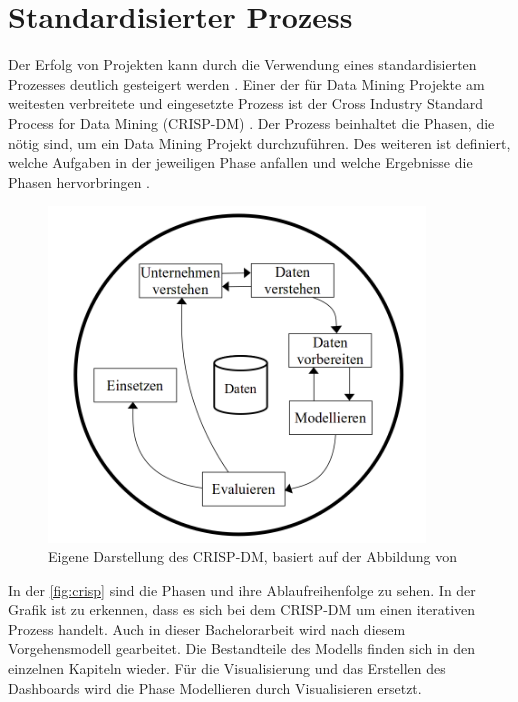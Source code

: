 \section{Standardisierter Prozess}
Der Erfolg von Projekten kann durch die Verwendung eines standardisierten Prozesses deutlich gesteigert werden \cite{wirth2000}.
Einer der für Data Mining Projekte am weitesten verbreitete und eingesetzte Prozess ist der Cross Industry Standard Process for Data Mining (CRISP-DM) \cite{d.kelleher2015crispdm}.
Der Prozess beinhaltet die Phasen, die nötig sind, um ein Data Mining Projekt durchzuführen. 
Des weiteren ist definiert, welche Aufgaben in der jeweiligen Phase anfallen und welche Ergebnisse die Phasen hervorbringen \cite{wirth2000}.

\begin{figure}[h]
\centering
\includegraphics[width=100mm,scale=1]{content/CRISP-Prozess.png}
\caption{Eigene Darstellung des CRISP-DM, basiert auf der Abbildung von \cite{wirth2000}}\label{fig:crisp}
\end{figure}
In der \autoref{fig:crisp} sind die Phasen und ihre Ablaufreihenfolge zu sehen. 
In der Grafik ist zu erkennen, dass es sich bei dem CRISP-DM um einen iterativen Prozess handelt.
Auch in dieser Bachelorarbeit wird nach diesem Vorgehensmodell gearbeitet. 
Die Bestandteile des Modells finden sich in den einzelnen Kapiteln wieder. 
Für die Visualisierung und das Erstellen des Dashboards wird die Phase Modellieren durch Visualisieren ersetzt. 
\\


